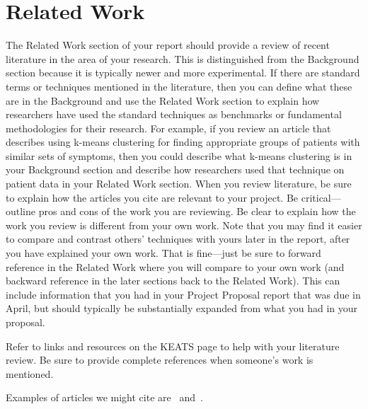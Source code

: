\section{Related Work}

The Related Work section of your report should provide a review of recent literature in the area of your research. This is distinguished from the Background section because it is typically newer and more experimental. If there are standard terms or techniques mentioned in the literature, then you can define what these are in the Background and use the Related Work section to explain how researchers have used the standard techniques as benchmarks or fundamental methodologies for their research. For example, if you review an article that describes using k-means clustering for finding appropriate groups of patients with similar sets of symptoms, then you could describe what k-means clustering is in your Background section and describe how researchers used that technique on patient data in your Related Work section. When you review literature, be sure to explain how the articles you cite are relevant to your project. Be critical---outline pros and cons of the work you are reviewing. Be clear to explain how the work you review is different from your own work. Note that you may find it easier to compare and contrast others' techniques with yours later in the report, after you have explained your own work. That is fine---just be sure to forward reference in the Related Work where you will compare to your own work (and backward reference in the later sections back to the Related Work). This can include information that you had in your Project Proposal report that was due in April, but should typically be substantially expanded from what you had in your proposal.

Refer to links and resources on the KEATS page to help with your literature review.
Be sure to provide complete references when someone's work is mentioned.

Examples of articles we might cite are~\cite{Doe11} and~\cite{JohSil05}.
